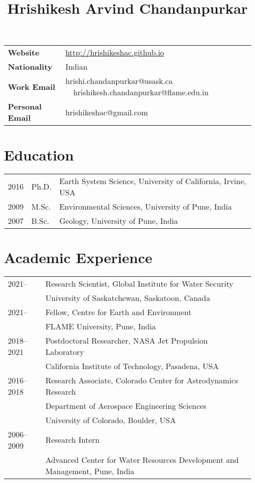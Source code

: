 \documentclass[10pt]{article}
\begin{document}
\title{\centerline{Hrishikesh Arvind Chandanpurkar}}

\author{}


\date{\rightline{\today}}


\begingroup
\let\center\flushleft
\let\endcenter\endflushleft
\maketitle
\endgroup


\sloppy


\begin{tabular}{ l l }
{\bf Website}& \href{http://hrishikeshac.github.io}{http://hrishikeshac.github.io} \\ 
{\bf Nationality} & Indian \\
{\bf Work Email} & hrishi.chandanpurkar@usask.ca \ \ hrishikesh.chandanpurkar@flame.edu.in \\
{\bf Personal Email} & hrishikeshac@gmail.com \\
\end{tabular} 

\section*{Education}
\hline
\label{education}
\begin{tabular}{ l l l }
2016 & Ph.D. & Earth System Science, University of California, Irvine, USA\\ 
2009 & M.Sc. & Environmental Sciences, University of Pune, India\\ 
2007 & B.Sc. & Geology, University of Pune, India\\ 
\end{tabular} 

\section*{Academic Experience}
\hline
\label{academic-experience}
\begin{tabular}{ l l }
2021-- & Research Scientist, Global Institute for Water Security\\ 
{} & University of Saskatchewan, Saskatoon, Canada \\ 
2021-- & Fellow, Centre for Earth and Environment \\
{} & FLAME University, Pune, India \\
2018--2021 & Postdoctoral Researcher, NASA Jet Propulsion Laboratory \\
{} & California Institute of Technology, Pasadena, USA \\
2016--2018 & Research Associate, Colorado Center for Astrodynamics Research \\
{} &  Department of Aerospace Engineering Sciences \\
{} & University of Colorado, Boulder, USA \\                    
2006--2009 & Research Intern \\
{} & Advanced Center for Water Resources Development and Management, Pune, India \\
\end{tabular} 
\end{document}
